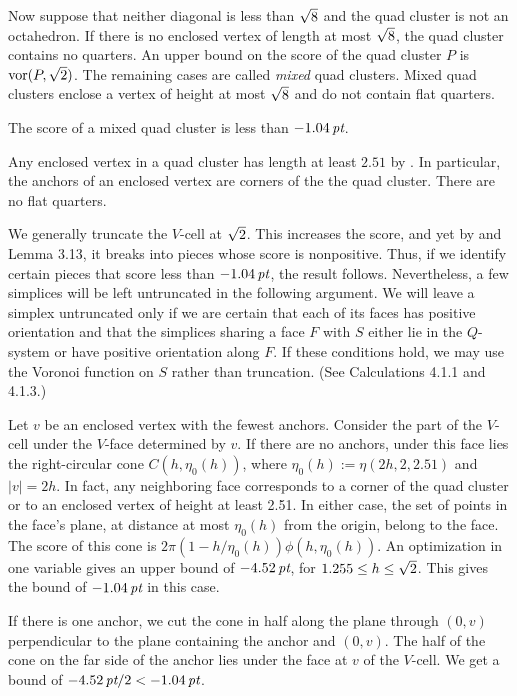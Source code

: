 Now suppose that neither diagonal is less than $\sqrt8$ and the
quad cluster is not an octahedron.  
If there is no enclosed
vertex of length at most $\sqrt8$,
the quad cluster contains no quarters. An upper bound 
on the score of the quad
cluster $P$ is $\operatorname{vor}(P,\sqrt2)$.
The remaining cases are called {\it mixed\/} quad clusters.
Mixed quad clusters enclose a vertex of height at most $\sqrt8$ and
do not contain flat quarters.

\bigskip
{}\endhead
\bigskip


  The score of a mixed quad cluster is less
than $-1.04\,\hbox{\it pt}$.\endproclaim

Any enclosed vertex in a quad cluster has length
at least $2.51$ by \cite{III,2.5.1}.  In particular, the anchors of an
enclosed vertex are corners of the the quad cluster.
There are no flat quarters.

We generally truncate the $V$-cell
at $\sqrt2$.  This increases the score, and yet
by \cite{II} and Lemma 3.13, it breaks into pieces
whose score is nonpositive.  Thus, if we identify certain pieces
that score less than $-1.04\,\hbox{\it pt}$, the result follows.  Nevertheless,
a few simplices will be left untruncated in the following argument.
We will leave a simplex untruncated only if we are certain that
each of its faces has positive orientation and that the simplices
sharing a face $F$ with $S$ either lie in the $Q$-system or have
positive orientation along $F$.  If these conditions hold, we may
use the Voronoi function on $S$ rather than truncation. (See
Calculations 4.1.1 and 4.1.3.)

Let $v$ be an enclosed vertex with the fewest anchors.  Consider
the part of the $V$-cell under the $V$-face determined by $v$.
If there are no anchors, under this face lies the right-circular
cone $C(h,\eta_0(h))$, where $\eta_0(h):=\eta(2h,2,2.51)$
and $|v|=2h$.  In fact, any neighboring
face corresponds to a corner of the quad cluster or to an
enclosed vertex of height at least 2.51.  In either case, the
set of points in the face's plane, at distance at most $\eta_0(h)$
from the origin, belong to the face.
The score of this cone is $2\pi(1-h/\eta_0(h))\phi(h,\eta_0(h))$.
An optimization in one variable gives an upper bound of $-4.52\,\hbox{\it pt}$,
for $1.255\le h\le \sqrt2$.   This gives the bound of $-1.04\,\hbox{\it pt}$
in this case.

If there is one anchor,  we cut the cone in half along the
plane through $(0,v)$ perpendicular to the plane containing the
anchor and $(0,v)$.  The half of the cone on the far side of the
anchor lies under the face at $v$ of the $V$-cell.  We get a bound of
$-4.52\,\hbox{\it pt}/2 < -1.04\,\hbox{\it pt}$.

